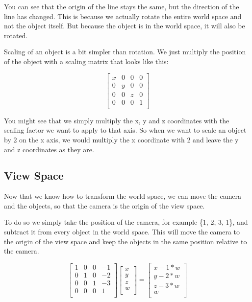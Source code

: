 \documentclass[12pt]{report} \usepackage{preamble}
\begin{document}
You can see that the origin of the line stays the same, but the direction
of the line has changed. This is because we actually rotate the entire
world space and not the object itself. But because the object is in the
world space, it will also be rotated.

Scaling of an object is a bit simpler than rotation. We just multiply
the position of the object with a scaling matrix that
looks like this:

\[
	\begin{bmatrix}
		x & 0 & 0 & 0 \\
		0 & y & 0 & 0 \\
		0 & 0 & z & 0 \\
		0 & 0 & 0 & 1 \\
	\end{bmatrix}
\]

You might see that we simply multiply the x, y and z coordinates with the
scaling factor we want to apply to that axis. So when we want to scale an
object by 2 on the x axis, we would multiply the x coordinate with 2 and
leave the y and z coordinates as they are.

\subsection{View Space}

Now that we know how to transform the world space, we can move the camera
and the objects, so that the camera is the origin of the view space.

To do so we simply take the position of the camera, for example \{1, 2, 3, 1\},
and subtract it from every object in the world space. This will move the
camera to the origin of the view space and keep the objects in the same
position relative to the camera.

\[
	\begin{bmatrix}
		1 & 0 & 0 & -1 \\
		0 & 1 & 0 & -2 \\
		0 & 0 & 1 & -3 \\
		0 & 0 & 0 & 1  \\
	\end{bmatrix}
	\begin{bmatrix}
		x \\
		y \\
		z \\
		w \\
	\end{bmatrix}
	=
	\begin{bmatrix}
		x - 1*w \\
		y - 2*w \\
		z - 3*w \\
		w       \\
	\end{bmatrix}
\]
\end{document}
